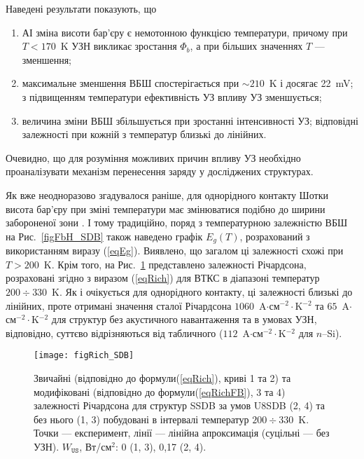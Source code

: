 \documentclass[a4paper,14pt,oneside,openany]{memoir}
\begin{document}
Наведені результати показують, що
\begin{enumerate}[label=\asbuk*),leftmargin=0em,itemindent=1.5em]
\item АІ зміна висоти бар'єру є немотонною функцією температури, причому при $T<170$~K УЗН викликає зростання $\Phi_b$,
а при більших значеннях $T$ --- зменшення;
\item максимальне зменшення ВБШ спостерігається при $\sim210$~K і досягає 22~mV;
з підвищенням температури ефективність УЗ впливу УЗ зменшується;
\item величина зміни ВБШ збільшується при зростанні інтенсивності УЗ; відповідні залежності при кожній з температур
близькі до лінійних.
\end{enumerate}
Очевидно, що для розуміння можливих причин впливу УЗ необхідно проаналізувати механізм перенесення заряду
у досліджених структурах.

Як вже неодноразово згадувалося раніше, для однорідного контакту Шотки висота бар'єру при зміні температури має змінюватися подібно
до ширини забороненої зони \cite{Rhoderick1988,Aboelfotoh,Zhua}.
І тому традиційно, поряд з температурною залежністю ВБШ на Рис.~\ref{figFbH_SDB} також наведено графік $E_g(T)$,
розрахований з використанням виразу (\ref{eqEg}).
Виявлено, що загалом ці залежності схожі при $T>200$~K.
Крім того, на Рис.~\ref{figRich_SDB} представлено залежності Річардсона, розраховані згідно з
виразом (\ref{eqRich}) для ВТКС в діапазоні температур $200\div330$~K.
Як і очікується для однорідного контакту, ці залежності близькі до лінійних,
проте отримані значення сталої Річардсона $1060$~A$\cdot$см$^{-2}\cdot$K$^{-2}$ та $65$~A$\cdot$см$^{-2}\cdot$K$^{-2}$
для структур без акустичного навантаження та в умовах УЗН, відповідно, суттєво відрізняються
від табличного ($112$~A$\cdot$см$^{-2}\cdot$K$^{-2}$ для $n$--Si).


\begin{figure}
\center
\texttt{[image: figRich\_SDB]}
\caption{\label{figRich_SDB}
Звичайні (відповідно до формули(\ref{eqRich}), криві 1 та 2)
та модифіковані (відповідно до формули(\ref{eqRichFB}), 3 та 4)
залежності Річардсона для структур SSDB за умов U8SDB (2, 4) та без нього (1, 3) побудовані в інтервалі
температур $200\div330$~K.
Точки --- експеримент, лінії --- лінійна апроксимація (суцільні --- без УЗН).
$W_\mathtt{US}$,  Вт/см$^2$: 0 (1, 3), 0,17 (2, 4).
}%
\end{figure}
\end{document}

